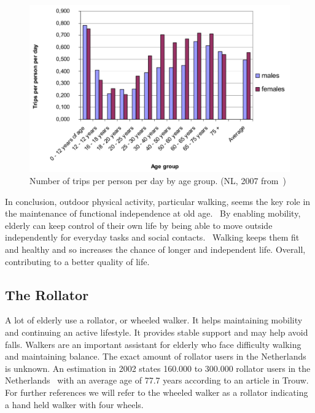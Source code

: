 \begin{figure}[h]
\includegraphics[width=\textwidth]{img/I3_numberOfTripsPerPersonPerDayByAge.pdf}
\centering
\caption[Number of trips per person per day by age group]{
Number of trips per person per day by age group. (NL, 2007 from~\cite{countryReport}) \label{percwalk}}
\end{figure}

In conclusion, outdoor physical activity, particular walking, seems the key role in the maintenance of functional independence at old age.~\cite{Rantakokko2009} By enabling mobility, elderly can keep control of their own life by being able to move outside independently for everyday tasks and social contacts.~\cite{MENSenSTRAAT2014} Walking keeps them fit and healthy and so increases the chance of longer and independent life. Overall, contributing to a better quality of life. 

\subsection{The Rollator}
A lot of elderly use a rollator, or wheeled walker. It helps maintaining mobility and continuing an active lifestyle. It provides stable support and may help avoid falls. Walkers are an important assistant for elderly who face difficulty walking and maintaining balance. The exact amount of rollator users in the Netherlands is unknown. An estimation in 2002 states 160.000 to 300.000 rollator users in the Netherlands~\cite{VeiligheidNL2012} with an average age of 77.7 years according to an article in Trouw.~\cite{Trouw2003} 
For further references we will refer to the wheeled walker as a rollator indicating a hand held walker with four wheels. 


